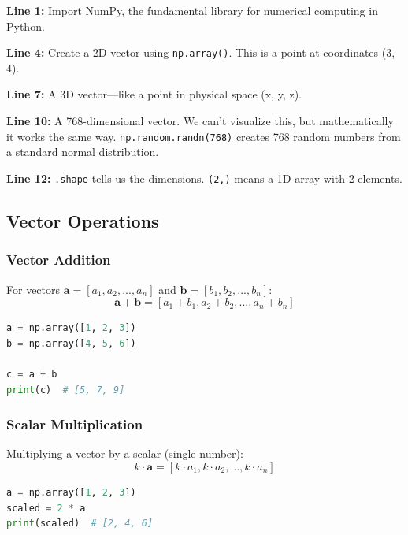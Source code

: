 \documentclass[12pt,a4paper]{article}
\begin{document}
\begin{explanation}
\textbf{Line 1:} Import NumPy, the fundamental library for numerical computing in Python.

\textbf{Line 4:} Create a 2D vector using \texttt{np.array()}. This is a point at coordinates (3, 4).

\textbf{Line 7:} A 3D vector---like a point in physical space (x, y, z).

\textbf{Line 10:} A 768-dimensional vector. We can't visualize this, but mathematically it works the same way. \texttt{np.random.randn(768)} creates 768 random numbers from a standard normal distribution.

\textbf{Line 12:} \texttt{.shape} tells us the dimensions. \texttt{(2,)} means a 1D array with 2 elements.
\end{explanation}

\subsection{Vector Operations}

\subsubsection{Vector Addition}

\begin{mathbox}
For vectors $\mathbf{a} = [a_1, a_2, ..., a_n]$ and $\mathbf{b} = [b_1, b_2, ..., b_n]$:
\[
\mathbf{a} + \mathbf{b} = [a_1 + b_1, a_2 + b_2, ..., a_n + b_n]
\]
\end{mathbox}

\begin{lstlisting}[language=Python,caption={Vector addition}]
a = np.array([1, 2, 3])
b = np.array([4, 5, 6])

c = a + b
print(c)  # [5, 7, 9]
\end{lstlisting}

\subsubsection{Scalar Multiplication}

\begin{mathbox}
Multiplying a vector by a scalar (single number):
\[
k \cdot \mathbf{a} = [k \cdot a_1, k \cdot a_2, ..., k \cdot a_n]
\]
\end{mathbox}

\begin{lstlisting}[language=Python,caption={Scalar multiplication}]
a = np.array([1, 2, 3])
scaled = 2 * a
print(scaled)  # [2, 4, 6]
\end{lstlisting}
\end{document}
